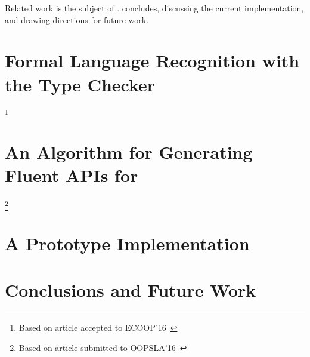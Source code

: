 \documentclass[12pt]{book}
\begin{document}
Related work is the subject of . 
concludes, discussing the current implementation, and drawing 
directions for future
work.

\chapter{Formal Language Recognition with the \protect \Java Type Checker}
\label{chapter:gallery}
\footnote{Based on article accepted to ECOOP'16~\protect\cite{Gil:Levy:2016}}
%

\chapter{An Algorithm for Generating Fluent APIs for \protect\Java}
\footnote{Based on article submitted to OOPSLA'16~\cite{Gil:Levy:2016a}}
\label{chapter:elements}
%

\chapter{A Prototype Implementation}
\label{chapter:tokens}
%

\chapter{Conclusions and Future Work}
\label{chapter:conclusions}





\end{document}
